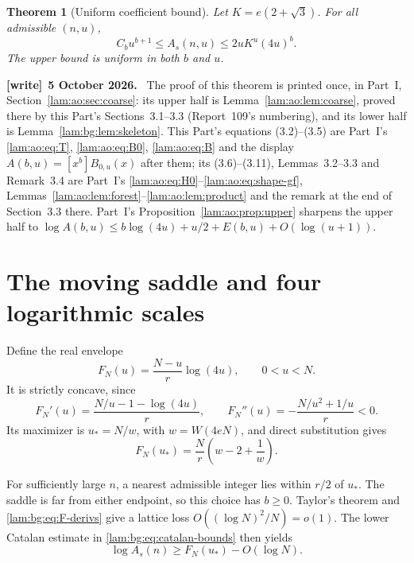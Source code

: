 \documentclass[11pt,a4paper]{article}
\numberwithin{equation}{section}
\newtheorem{theorem}{Theorem}[section]
\theoremstyle{remark}
\newenvironment{writenote}[1][]{\par\smallskip\begingroup\small
 \noindent\textbf{[write]}\if\relax\detokenize{#1}\relax\else~\textbf{#1.}\fi\ }%
 {\par\endgroup\smallskip}
\begin{document}
\begin{theorem}[Uniform coefficient bound]\label{lam:bg:thm:uniform}
Let $K=e(2+\sqrt3)$. For all admissible $(n,u)$,
\begin{equation}\label{lam:bg:eq:uniform}
 C_bu^{b+1}\le A_s(n,u)\le 2uK^u(4u)^b.
\end{equation}
The upper bound is uniform in both $b$ and $u$.
\end{theorem}
\begin{writenote}[5 October 2026]
The proof of this theorem is printed once, in Part~I, Section~\ref{lam:ao:sec:coarse}: its upper half is Lemma~\ref{lam:ao:lem:coarse}, proved there by this Part's Sections~3.1--3.3 (Report~109's numbering), and its lower half is Lemma~\ref{lam:bg:lem:skeleton}. This Part's equations (3.2)--(3.5) are Part~I's \eqref{lam:ao:eq:T}, \eqref{lam:ao:eq:B0}, \eqref{lam:ao:eq:B} and the display $A(b,u)=[x^b]B_{0,u}(x)$ after them; its (3.6)--(3.11), Lemmas~3.2--3.3 and Remark~3.4 are Part~I's \eqref{lam:ao:eq:H0}--\eqref{lam:ao:eq:shape-gf}, Lemmas~\ref{lam:ao:lem:forest}--\ref{lam:ao:lem:product} and the remark at the end of Section~3.3 there. Part~I's Proposition~\ref{lam:ao:prop:upper} sharpens the upper half to $\log A(b,u)\le b\log(4u)+u/2+E(b,u)+O(\log(u+1))$.
\end{writenote}


\section{The moving saddle and four logarithmic scales}\label{lam:bg:sec:saddle}
Define the real envelope
\begin{equation}\label{lam:bg:eq:F}
 F_N(u)=\frac{N-u}{r}\log(4u),\qquad0<u<N.
\end{equation}
It is strictly concave, since
\begin{equation}\label{lam:bg:eq:F-derivs}
 F_N'(u)=\frac{N/u-1-\log(4u)}r,\qquad
 F_N''(u)=-\frac{N/u^2+1/u}{r}<0.
\end{equation}
Its maximizer is $u_*=N/w$, with $w=W(4eN)$, and direct substitution gives
\begin{equation}\label{lam:bg:eq:Fmax}
 F_N(u_*)=\frac Nr\left(w-2+\frac1w\right).
\end{equation}

For sufficiently large $n$, a nearest admissible integer lies within $r/2$ of $u_*$. The saddle is far from either endpoint, so this choice has $b\ge0$. Taylor's theorem and \eqref{lam:bg:eq:F-derivs} give a lattice loss $O((\log N)^2/N)=o(1)$. The lower Catalan estimate in \eqref{lam:bg:eq:catalan-bounds} then yields
\begin{equation}\label{lam:bg:eq:lower-saddle}
 \log A_s(n)\ge F_N(u_*)-O(\log N).
\end{equation}
\end{document}
